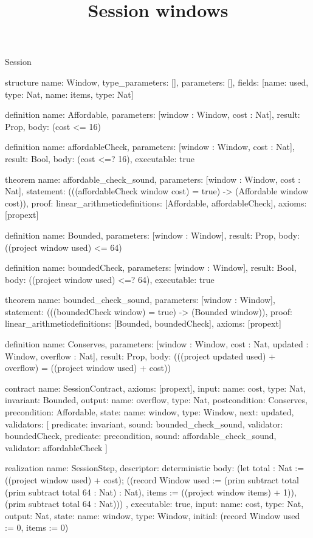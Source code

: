 \begin{lexlean}{Session}
\title{Session windows}
\begin{semanticmodule}
structure{
  name: Window,
  type_parameters: [],
  parameters: [],
  fields: [{name: used, type: Nat}, {name: items, type: Nat}]
}

definition{
  name: Affordable,
  parameters: [window : Window, cost : Nat],
  result: Prop,
  body: (cost <= 16)
}

definition{
  name: affordableCheck,
  parameters: [window : Window, cost : Nat],
  result: Bool,
  body: (cost <=? 16),
  executable: true
}

theorem{
  name: affordable_check_sound,
  parameters: [window : Window, cost : Nat],
  statement: (((affordableCheck window cost) = true) -> (Affordable window cost)),
  proof: linear_arithmetic{definitions: [Affordable, affordableCheck]},
  axioms: [propext]
}

definition{
  name: Bounded,
  parameters: [window : Window],
  result: Prop,
  body: ((project window used) <= 64)
}

definition{
  name: boundedCheck,
  parameters: [window : Window],
  result: Bool,
  body: ((project window used) <=? 64),
  executable: true
}

theorem{
  name: bounded_check_sound,
  parameters: [window : Window],
  statement: (((boundedCheck window) = true) -> (Bounded window)),
  proof: linear_arithmetic{definitions: [Bounded, boundedCheck]},
  axioms: [propext]
}

definition{
  name: Conserves,
  parameters: [window : Window, cost : Nat, updated : Window, overflow : Nat],
  result: Prop,
  body: (((project updated used) + overflow) = ((project window used) + cost))
}

contract{
  name: SessionContract,
  axioms: [propext],
  input: {name: cost, type: Nat},
  invariant: Bounded,
  output: {name: overflow, type: Nat},
  postcondition: Conserves,
  precondition: Affordable,
  state: {name: window, type: Window, next: updated},
  validators: [
    {predicate: invariant, sound: bounded_check_sound, validator: boundedCheck},
    {predicate: precondition, sound: affordable_check_sound, validator: affordableCheck}
  ]
}

realization{
  name: SessionStep,
  descriptor: deterministic{
    body: (let total : Nat := ((project window used) + cost); ((record Window {used := (prim subtract total (prim subtract total 64 : Nat) : Nat), items := ((project window items) + 1)}), (prim subtract total 64 : Nat)))
  },
  executable: true,
  input: {name: cost, type: Nat},
  output: Nat,
  state: {name: window, type: Window, initial: (record Window {used := 0, items := 0})}
}


\end{semanticmodule}
\end{lexlean}
